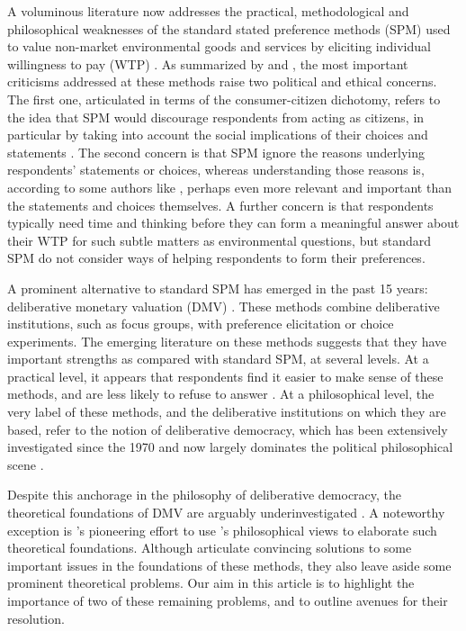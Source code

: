 \documentclass[version=3.21, pagesize, twoside=off, bibliography=totoc, DIV=calc, fontsize=12pt, a4paper, french, english]{scrartcl}
\begin{document}
{A voluminous literature now addresses the practical, methodological and philosophical weaknesses of the standard stated preference methods (SPM) used to value non-market environmental goods and services by eliciting individual willingness to pay (WTP) \citep{meinard_ethical_2016}. 
As summarized by \cite{bartkowski_beyond_2018} and \cite{bartkowski_deliberative_2019}, the most important criticisms addressed at these methods raise two political and ethical concerns. 
The first one, articulated in terms of the consumer-citizen dichotomy, refers to the idea that SPM would discourage respondents from acting as citizens, in particular by taking into account the social implications of their  choices and statements \citep{soma_representing_2014, vatn_institutional_2009}. 
The second concern is that SPM ignore the reasons underlying respondents' statements or choices, whereas understanding those reasons is, according to some authors like \citet{sen_environmental_1995}, perhaps even more relevant and important than the statements and choices themselves. A further concern is that respondents typically need time and thinking before they can form a meaningful answer about their WTP for such subtle matters as environmental questions, but standard SPM do not consider ways of helping respondents to form their preferences.

A prominent alternative to standard SPM has emerged in the past 15 years: deliberative monetary valuation (DMV) \citep{spash_deliberative_2007,bartkowski_economic_2017}. 
These methods combine deliberative institutions, such as focus groups, with preference elicitation or choice experiments. 
The emerging literature on these methods suggests that they have important strengths as compared with standard SPM, at several levels. 
At a practical level, it appears that respondents find it easier to make sense of these methods, and are less likely to refuse to answer \citep{lienhoop_contingent_2007,szabo_reducing_2011}. 
At a philosophical level, the very label of these methods, and the deliberative institutions on which they are based, refer to the notion of deliberative democracy, which has been extensively investigated since the 1970 and now largely dominates the political philosophical scene \citep{chappell_deliberative_2012}.

Despite this anchorage in the philosophy of deliberative democracy, the theoretical foundations of DMV are arguably underinvestigated \citep{bartkowski_economic_2017,bartkowski_beyond_2018,bunse_what_2015,kenter_what_2015}. 
A noteworthy exception is \citet{bartkowski_beyond_2018}'s pioneering effort to use \citet{sen_idea_2009}'s philosophical views to elaborate such theoretical foundations. 
Although \citet{bartkowski_beyond_2018} articulate convincing solutions to some important issues in the foundations of these methods, they also leave aside some prominent theoretical problems. 
Our aim in this article is to highlight the importance of two of these remaining problems, and to outline avenues for their resolution.

}
\end{document}
